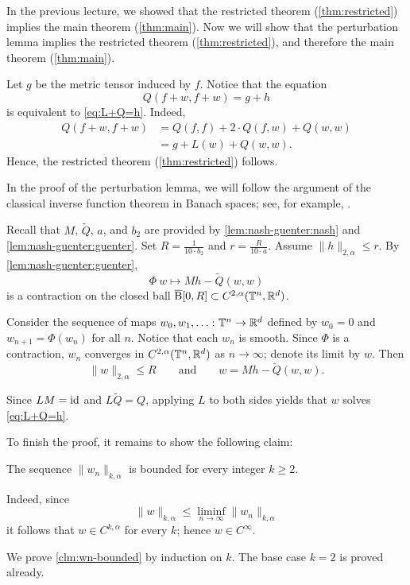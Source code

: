 In the previous lecture, we showed that the restricted theorem (\ref{thm:restricted}) implies the main theorem (\ref{thm:main}).
Now we will show that the perturbation lemma implies the restricted theorem (\ref{thm:restricted}), and therefore the main theorem (\ref{thm:main}).

Let $g$ be the metric tensor induced by $f$.
Notice that the equation
\[
Q(f+w, f+w) = g + h
\]
is equivalent to \ref{eq:L+Q=h}.
Indeed,
\begin{align*}
Q(f+w, f+w) &= Q(f, f) + 2 \cdot Q(f, w) + Q(w, w) \\
            &= g + L(w) + Q(w, w).
\end{align*}
Hence, the restricted theorem (\ref{thm:restricted}) follows. \qeds

In the proof of the perturbation lemma, we will follow the argument of the classical inverse function theorem in Banach spaces; see, for example, \cite{lang}.


Recall that $M$, $\tilde Q$, $a$, and $b_2$ are provided by \ref{lem:nash-guenter:nash} and \ref{lem:nash-guenter:guenter}.
Set $R=\tfrac1{10\cdot b_2}$ and $r=\tfrac R{10\cdot a}$.
Assume $\|h\|_{2,\alpha}\le r$.
By \ref{lem:nash-guenter:guenter},
\[\Phi\:w\mapsto Mh-\tilde Q(w,w)\]
is a contraction on the closed ball $\overline{\mathrm{B}}{}[0,R]\subset {C^{2,\alpha}(\mathbb{T}^n,\mathbb{R}^d)}$.

Consider the sequence of maps $w_0,w_1,\dots\colon\mathbb{T}^n\to\mathbb{R}^d$ defined by $w_0=0$ and $w_{n+1}=\Phi(w_n)$ for all $n$.
Notice that each $w_n$ is smooth.
Since $\Phi$ is a contraction, $w_n$ converges in $C^{2,\alpha}(\mathbb{T}^n,\mathbb{R}^d)$ as $n\to\infty$;
denote its limit by $w$.
Then
\[\|w\|_{2,\alpha}\le R
\qquad\text{and}\qquad
w= Mh-\tilde Q(w,w).\]

Since $LM=\operatorname{\rm id}\nolimits$ and $L\tilde Q=Q$, applying $L$ to both sides yields that $w$ solves \ref{eq:L+Q=h}.

To finish the proof, it remains to show the following claim:
\begin{clm}{}\label{clm:wn-bounded}
The sequence $\|w_n\|_{k,\alpha}$ is bounded for every integer $k\ge 2$.
\end{clm}

Indeed, since
\[\|w\|_{k,\alpha}\le \liminf_{n\to\infty}\|w_n\|_{k,\alpha}\]
it follows that $w\in C^{k,\alpha}$ for every $k$;
hence $w\in C^\infty$.

We prove \ref{clm:wn-bounded} by induction on $k$.
The base case $k=2$ is proved already.

